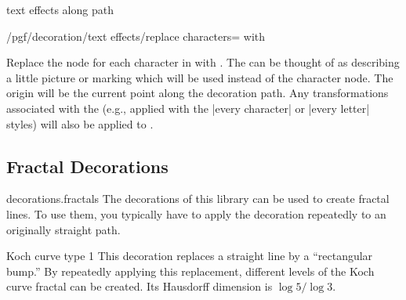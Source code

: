 \begin{decoration}{text effects along path}
\begin{key}{/pgf/decoration/text effects/replace characters= with }

  Replace the node for each character in  with . 
  The  can be thought of as describing
  a little picture or marking which will be
  used instead of the character node. 
  The origin will be the current point along the 
  decoration path.
  Any transformations associated with
  the  (e.g., applied with the |every character|
  or |every letter| styles) will also be applied to .
  
\begin{codeexample}[]
\end{codeexample}

\end{key}
\end{decoration}



\subsection{Fractal Decorations}

\begin{pgflibrary}{decorations.fractals}
  The decorations of this library can be used to create fractal
  lines. To use them, you typically have to apply the decoration
  repeatedly to an originally straight path.
\end{pgflibrary}


\begin{decoration}{Koch curve type 1}
  This decoration replaces a straight line by a ``rectangular bump.''
  By repeatedly applying this replacement, different levels of the
  Koch curve fractal can be created. Its Hausdorff dimension is $\log
  5/\log 3$.
\begin{codeexample}[]
\end{codeexample}
\end{decoration}


